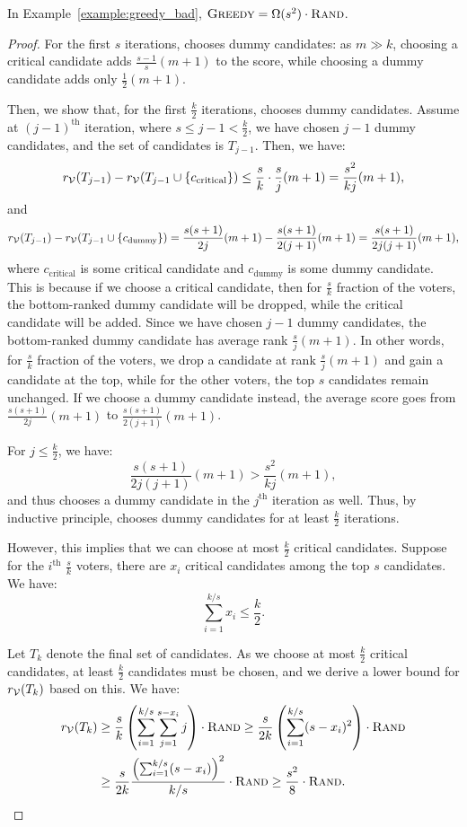 \begin{proposition}
In Example~\ref{example:greedy_bad}, ${\normalfont\textsc{Greedy}}{} = \Omega(s^2)\cdot {\normalfont\textsc{Rand}}$.
\end{proposition}
\begin{proof}
For the first $s$ iterations, \g{} chooses dummy candidates: as $m \gg k$, choosing a critical candidate adds $\frac{s - 1}{s}(m + 1)$ to the score, while choosing a dummy candidate adds only $\frac{1}{2}(m + 1)$.

Then, we show that, for the first $\frac{k}{2}$ iterations, \g{} chooses dummy candidates. Assume at $(j - 1)^{\text{th}}$ iteration, where $s \leq j - 1 < \frac{k}{2}$, we have chosen $j - 1$ dummy candidates, and the set of candidates is $T_{j - 1}$. Then, we have:
\[
r_{\mathcal{V}}(T_{j - 1}) - r_{\mathcal{V}}(T_{j - 1} \cup \{c_\mathrm{critical}\}) \leq \frac{s}{k}\cdot \frac{s}{j}(m + 1) = \frac{s^2}{kj}(m + 1),
\]
and
\[
r_{\mathcal{V}}(T_{j - 1}) - r_{\mathcal{V}}(T_{j - 1} \cup \{c_\mathrm{dummy}\}) = \frac{s(s + 1)}{2j}(m + 1) - \frac{s(s + 1)}{2(j + 1)}(m + 1) = \frac{s(s + 1)}{2j(j + 1)}(m + 1),
\]
where $c_\mathrm{critical}$ is some critical candidate and $c_\mathrm{dummy}$ is some dummy candidate. This is because if we choose a critical candidate, then for $\frac{s}{k}$ fraction of the voters, the bottom-ranked dummy candidate will be dropped, while the critical candidate will be added. Since we have chosen $j - 1$ dummy candidates, the bottom-ranked dummy candidate has average rank $\frac{s}{j}(m + 1)$. In other words, for $\frac{s}{k}$ fraction of the voters, we drop a candidate at rank $\frac{s}{j}(m + 1)$ and gain a candidate at the top, while for the other voters, the top $s$ candidates remain unchanged. If we choose a dummy candidate instead, the average score goes from $\frac{s(s + 1)}{2j}(m + 1)$ to $\frac{s(s + 1)}{2(j + 1)}(m + 1)$.

For $j \leq \frac{k}{2}$, we have:
$$\frac{s(s + 1)}{2j(j + 1)}(m + 1) > \frac{s^2}{kj}(m + 1),$$
and thus \g{} chooses a dummy candidate in the $j^{\text{th}}$ iteration as well. Thus, by inductive principle, \g{} chooses dummy candidates for at least $\frac{k}{2}$ iterations.

However, this implies that we can choose at most $\frac{k}{2}$ critical candidates. Suppose for the $i^{\text{th}}$ $\frac{s}{k}$ voters, there are $x_i$ critical candidates among the top $s$ candidates. We have:
$$\sum_{i = 1}^{k/s}x_i \leq \frac{k}{2}.$$

Let $T_k$ denote the final set of candidates. As we choose at most $\frac{k}{2}$ critical candidates, at least $\frac{k}{2}$ candidates must be chosen, and we derive a lower bound for $r_{\mathcal{V}}(T_k)$ based on this. We have:
\begin{align*}
r_{\mathcal{V}}(T_k) &\geq \frac{s}{k}\left(\sum_{i = 1}^{k/s}\sum_{j = 1}^{s - x_i}j\right)\cdot {\normalfont\textsc{Rand}} \geq \frac{s}{2k}\left(\sum_{i = 1}^{k/s}(s - x_i)^2\right) \cdot {\normalfont\textsc{Rand}} \\
& \geq \frac{s}{2k} \frac{\left(\sum_{i = 1}^{k/s}(s - x_i)\right)^2}{k/s}\cdot {\normalfont\textsc{Rand}} \geq \frac{s^2}{8}\cdot {\normalfont\textsc{Rand}}.
\end{align*}


\end{proof}
